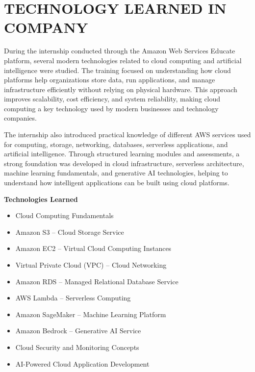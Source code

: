 \documentclass[12pt, a4paper, oneside]{report}
\begin{document}
\chapter{TECHNOLOGY LEARNED IN COMPANY}

During the internship conducted through the Amazon Web Services Educate platform, 
several modern technologies related to cloud computing and artificial intelligence 
were studied. The training focused on understanding how cloud platforms help 
organizations store data, run applications, and manage infrastructure efficiently without 
relying on physical hardware. This approach improves scalability, cost efficiency, and 
system reliability, making cloud computing a key technology used by modern 
businesses and technology companies.

The internship also introduced practical knowledge of different AWS services used for 
computing, storage, networking, databases, serverless applications, and artificial 
intelligence. Through structured learning modules and assessments, a strong foundation 
was developed in cloud infrastructure, serverless architecture, machine learning 
fundamentals, and generative AI technologies, helping to understand how intelligent 
applications can be built using cloud platforms.

\medskip
\noindent \textbf{Technologies Learned}

\begin{itemize}[leftmargin=1.5cm]
    \item Cloud Computing Fundamentals
    \item Amazon S3 -- Cloud Storage Service
    \item Amazon EC2 -- Virtual Cloud Computing Instances
    \item Virtual Private Cloud (VPC) -- Cloud Networking
    \item Amazon RDS -- Managed Relational Database Service
    \item AWS Lambda -- Serverless Computing
    \item Amazon SageMaker -- Machine Learning Platform
    \item Amazon Bedrock -- Generative AI Service
    \item Cloud Security and Monitoring Concepts
    \item AI-Powered Cloud Application Development
\end{itemize}
\end{document}
